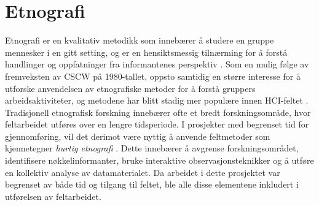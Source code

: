 \section{Etnografi}
\label{section:etnografi} 

Etnografi er en kvalitativ metodikk som innebærer å studere en gruppe mennesker i en gitt setting, og er en hensiktsmessig tilnærming for å forstå handlinger og oppfatninger fra informantenes perspektiv \citep{Blomberg93, Reeves08, Nardi97}. Som en mulig følge av fremveksten av CSCW på 1980-tallet, oppsto samtidig en større interesse for å utforske anvendelsen av etnografiske metoder for å forstå gruppers arbeidsaktiviteter, og metodene har blitt stadig mer populære innen HCI-feltet \citep{Blomberg93, Millen00}. Tradisjonell etnografisk forskning innebærer ofte et bredt forskningsområde, hvor feltarbeidet utføres over en lengre tidsperiode. I prosjekter med begrenset tid for gjennomføring, vil det derimot være nyttig å anvende feltmetoder som kjennetegner \textit{hurtig etnografi} \citep{Millen00}. Dette innebærer å avgrense forskningsområdet, identifisere nøkkelinformanter, bruke interaktive observasjonsteknikker og å utføre en kollektiv analyse av datamaterialet. Da arbeidet i dette prosjektet var begrenset av både tid og tilgang til feltet, ble alle disse elementene inkludert i utførelsen av feltarbeidet.



